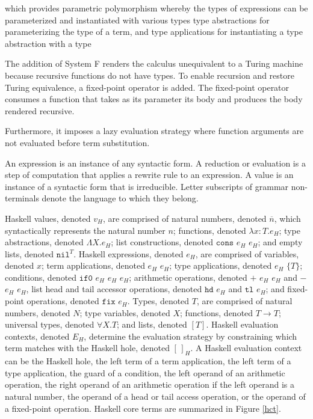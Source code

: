 which provides parametric polymorphism whereby the types of expressions can be parameterized and instantiated with various types type abstractions for parameterizing the type of a term, and type applications for instantiating a type abstraction with a type

The addition of System F renders the calculus unequivalent to a Turing machine because recursive functions do not have types.  To enable recursion and restore Turing equivalence, a fixed-point operator is added.  The fixed-point operator consumes a function that takes as its parameter its body and produces the body rendered recursive.



Furthermore, it imposes a lazy evaluation strategy where function arguments are not evaluated before term substitution.

An expression is an instance of any syntactic form.  A reduction or evaluation is a step of computation that applies a rewrite rule to an expression.  A value is an instance of a syntactic form that is irreducible.  Letter subscripts of grammar non-terminals denote the language to which they belong.

Haskell values, denoted $v_{H}$, are comprised of natural numbers, denoted $\overline{n}$, which syntactically represents the natural number $n$; functions, denoted $\lambda x:T.e_{H}$; type abstractions, denoted $\Lambda X.e_{H}$; list constructions, denoted $\mathtt{cons}$ $e_{H}$ $e_{H}$; and empty lists, denoted $\mathtt{nil}^{T}$.  Haskell expressions, denoted $e_{H}$, are comprised of variables, denoted $x$; term applications, denoted $e_{H}$ $e_{H}$; type applications, denoted $e_{H}$ $\lbrace T\rbrace$; conditions, denoted $\mathtt{if0}$ $e_{H}$ $e_{H}$ $e_{H}$; arithmetic operations, denoted $+$ $e_{H}$ $e_{H}$ and $-$ $e_{H}$ $e_{H}$, list head and tail accessor operations, denoted $\mathtt{hd}$ $e_{H}$ and $\mathtt{tl}$ $e_{H}$; and fixed-point operations, denoted $\mathtt{fix}$ $e_{H}$.  Types, denoted $T$, are comprised of natural numbers, denoted $N$; type variables, denoted $X$; functions, denoted $T\rightarrow T$; universal types, denoted $\forall X.T$; and lists, denoted $[T]$.  Haskell evaluation contexts, denoted $E_{H}$, determine the evaluation strategy by constraining which term matches with the Haskell hole, denoted $[\,]_{H}$.  A Haskell evaluation context can be the Haskell hole, the left term of a term application, the left term of a type application, the guard of a condition, the left operand of an arithmetic operation, the right operand of an arithmetic operation if the left operand is a natural number, the operand of a head or tail access operation, or the operand of a fixed-point operation.  Haskell core terms are summarized in Figure \ref{hct}.


